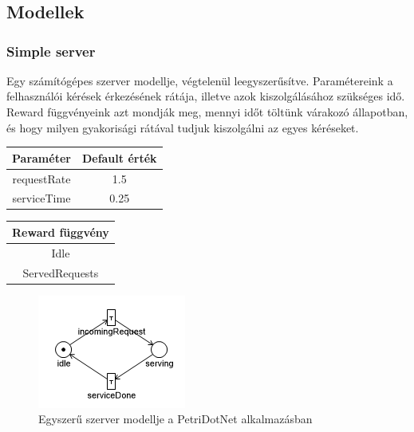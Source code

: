 \appendix
\chapter*{\fuggelek}
\setcounter{chapter}{\appendixnumber}

\section{Modellek}
\label{sec:fuggelek}
\subsection{Simple server}

Egy számítógépes szerver modellje, végtelenül leegyszerűsítve. Paramétereink a felhasználói kérések érkezésének rátája, illetve azok kiszolgálásához szükséges idő. Reward függvényeink azt mondják meg, mennyi időt töltünk várakozó állapotban, és hogy milyen gyakorisági rátával tudjuk kiszolgálni az egyes kéréseket.
\begin{center}
	\begin{tabular}{cc}
		\textbf{\textbf{Paraméter}} & \textbf{Default érték} \\
		\hline
		requestRate & 1.5\\
		serviceTime & 0.25\\
	\end{tabular}
	\label{table:filparam}
	\quad
	\begin{tabular}{c}
		\textbf{\textbf{Reward függvény}}\\
		\hline
		Idle\\
		ServedRequests\\
	\end{tabular}
	\label{table:filrewards}
\end{center}
\begin{figure}[!ht]
	\centering
	\includegraphics{figures/smpl.png}
	\caption{Egyszerű szerver modellje a PetriDotNet alkalmazásban}
\end{figure}

